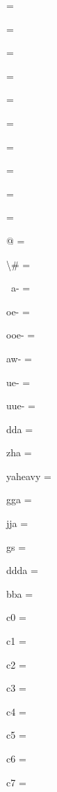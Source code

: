 \documentclass{article}
\begin{document}
\begin{multicols}{6}
 = {\fdeva {}}\par
{} = {\fdeva {}}\par
{} = {\fdeva {}}\par
{} = {\fdeva {}}\par
{} = {\fdeva {}}\par
{} = {\fdeva {}}\par
{} = {\fdeva {}}\par
{} = {\fdeva {}}\par
{} = {\fdeva {}}\par
{} = {\fdeva {}}\par
\noindent @ = {\fdeva {}}\par
\noindent \textbackslash\# = {\fdeva \vh{\#}}\par
\noindent ~a- = {\fdeva {}}\par
\noindent oe- = {\fdeva {}}\par
\noindent ooe- = {\fdeva {}}\par
\noindent aw- = {\fdeva {}}\par
\noindent ue- = {\fdeva {}}\par
\noindent uue- = {\fdeva {}}\par
\noindent dda = {\fdeva {}}\par
\noindent zha = {\fdeva {}}\par
\noindent yaheavy = {\fdeva {}}\par
\noindent gga = {\fdeva {}}\par
\noindent jja = {\fdeva {}}\par
\noindent gs = {\fdeva {}}\par
\noindent ddda = {\fdeva {}}\par
\noindent bba = {\fdeva {}}\par
\noindent c0 = {\fdeva {}}\par
\noindent c1 = {\fdeva {}}\par
\noindent c2 = {\fdeva {}}\par
\noindent c3 = {\fdeva {}}\par
\noindent c4 = {\fdeva {}}\par
\noindent c5 = {\fdeva {}}\par
\noindent c6 = {\fdeva {}}\par
\noindent c7 = {\fdeva {}}\par

\end{multicols}
\end{document}
